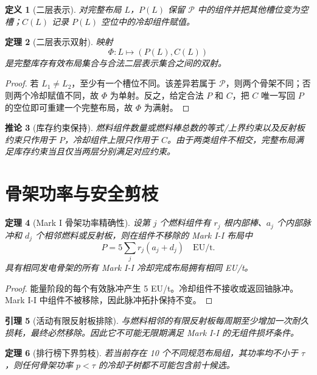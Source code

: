 \documentclass[UTF8,11pt]{ctexart}
\newtheorem{definition}{定义}[section]
\newtheorem{lemma}[definition]{引理}
\newtheorem{theorem}[definition]{定理}
\newtheorem{corollary}[definition]{推论}
\begin{document}
\begin{definition}[二层表示]
对完整布局 $L$，$P(L)$ 保留 $\mathcal P$ 中的组件并把其他槽位变为空槽；$C(L)$ 记录 $P(L)$ 空位中的冷却组件赋值。
\end{definition}

\begin{theorem}[二层表示双射]
映射
\[
\Phi:L\longmapsto(P(L),C(L))
\]
是完整库存有效布局集合与合法二层表示集合之间的双射。
\end{theorem}

\begin{proof}
若 $L_1\ne L_2$，至少有一个槽位不同。该差异若属于 $\mathcal P$，则两个骨架不同；否则两个冷却赋值不同，故 $\Phi$ 为单射。反之，给定合法 $P$ 和 $C$，把 $C$ 唯一写回 $P$ 的空位即可重建一个完整布局，故 $\Phi$ 为满射。
\end{proof}

\begin{corollary}[库存约束保持]
燃料组件数量或燃料棒总数的等式/上界约束以及反射板约束只作用于 $P$，冷却组件上限只作用于 $C$。由于两类组件不相交，完整布局满足库存约束当且仅当两层分别满足对应约束。
\end{corollary}

\section{骨架功率与安全剪枝}

\begin{theorem}[Mark I 骨架功率精确性]
设第 $j$ 个燃料组件有 $r_j$ 根内部棒、$a_j$ 个内部脉冲和 $d_j$ 个相邻燃料或反射板，则在组件不移除的 Mark I-I 布局中
\[
P=5\sum_j r_j(a_j+d_j)\quad\mathrm{EU/t}.
\]
具有相同发电骨架的所有 Mark I-I 冷却完成布局拥有相同 EU/t。
\end{theorem}

\begin{proof}
能量阶段的每个有效脉冲产生 5 EU/t。冷却组件不接收或返回铀脉冲。Mark I-I 中组件不被移除，因此脉冲拓扑保持不变。
\end{proof}

\begin{lemma}[活动有限反射板排除]
与燃料相邻的有限反射板每周期至少增加一次耐久损耗，最终必然移除。因此它不可能无限期满足 Mark I-I 的无组件损坏条件。
\end{lemma}

\begin{theorem}[排行榜下界剪枝]
若当前存在 10 个不同规范布局组，其功率均不小于 $\tau$，则任何骨架功率 $p<\tau$ 的冷却子树都不可能包含前十候选。
\end{theorem}
\end{document}
